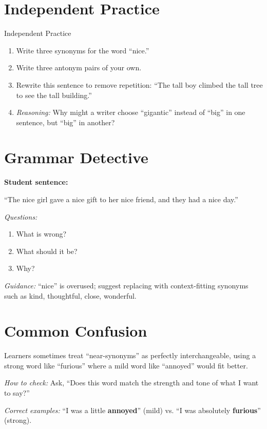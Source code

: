 \section{Independent Practice}
\begin{activitybox}{Independent Practice}
\begin{enumerate}
    \item Write three synonyms for the word ``nice.''
    \item Write three antonym pairs of your own.
    \item Rewrite this sentence to remove repetition: ``The tall boy climbed the tall tree to see the tall building.''
    \item \textit{Reasoning:} Why might a writer choose ``gigantic'' instead of ``big'' in one sentence, but ``big'' in another?
\end{enumerate}
\end{activitybox}

\section{Grammar Detective}
\begin{detectivebox}
\textbf{Student sentence:}

``The nice girl gave a nice gift to her nice friend, and they had a nice day.''

\textit{Questions:}
\begin{enumerate}
    \item What is wrong?
    \item What should it be?
    \item Why?
\end{enumerate}

\textit{Guidance:} ``nice'' is overused; suggest replacing with context-fitting synonyms such as kind, thoughtful, close, wonderful.
\end{detectivebox}

\section{Common Confusion}
\begin{warningbox}
Learners sometimes treat ``near-synonyms'' as perfectly interchangeable, using a strong word like ``furious'' where a mild word like ``annoyed'' would fit better.

\textit{How to check:} Ask, ``Does this word match the strength and tone of what I want to say?''

\textit{Correct examples:} ``I was a little \textbf{annoyed}'' (mild) vs. ``I was absolutely \textbf{furious}'' (strong).
\end{warningbox}

